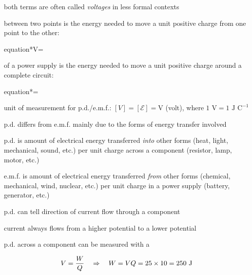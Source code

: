 both terms are often called \emph{voltages} in less formal contexts

\begin{ilight}
	 between two points is the energy needed to move a unit positive charge from one point to the other: \begin{empheq}[box=\tcbhighmath]{equation*}{V=}\end{empheq} 
\end{ilight}

\begin{ilight}
	 of a power supply is the energy needed to move a unit positive charge around a complete circuit: \begin{empheq}[box=\tcbhighmath]{equation*}{=} \end{empheq}
\end{ilight}


\cmt unit of measurement for p.d./e.m.f.: $[V] = [\mathcal{E}] = \text{V}$ (volt), where $1 \text{ V} = 1 \text{ J C}^{-1}$

\cmt p.d. differs from e.m.f. mainly due to the forms of energy transfer involved

p.d. is amount of electrical energy transferred \emph{into} other forms (heat, light, mechanical, sound, etc.) per unit charge across a component (resistor, lamp, motor, etc.)

e.m.f. is amount of electrical energy transferred \emph{from} other forms (chemical, mechanical, wind, nuclear, etc.) per unit charge in a power supply (battery, generator, etc.)

\cmt p.d. can tell direction of current flow through a component

current always flows from a higher potential to a lower potential

\cmt p.d. across a component can be measured with a 



\begin{soln}\begin{equation*}
	V = \frac{W}{Q} \quad \Rightarrow \quad W = V Q = 25 \times 10 = 250 \text{ J} 
\end{equation*}
\end{soln}

